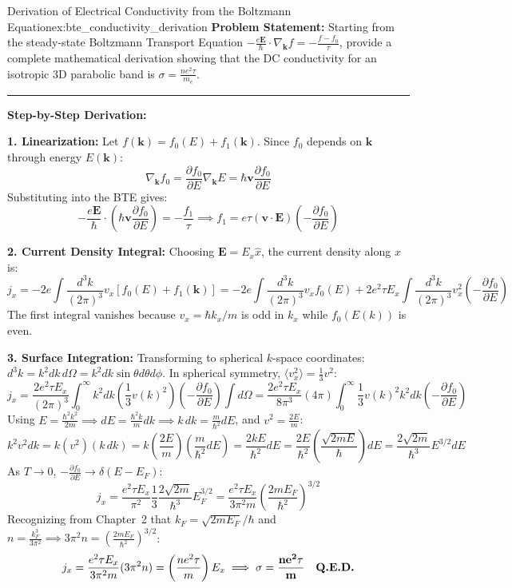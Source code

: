 \documentclass[11pt,a4paper]{article}
\newcommand{\vb}[1]{\mathbf{#1}}
\begin{document}
\begin{examplebox}{Derivation of Electrical Conductivity from the Boltzmann Equation}{ex:bte_conductivity_derivation}
\textbf{Problem Statement:}
Starting from the steady-state Boltzmann Transport Equation $-\frac{e\vb{E}}{\hbar}\cdot\nabla_{\vb{k}}f = -\frac{f - f_0}{\tau}$, provide a complete mathematical derivation showing that the DC conductivity for an isotropic 3D parabolic band is $\sigma = \frac{n e^2 \tau}{m_e}$.

\vspace{0.2cm}\hrule\vspace{0.2cm}
\textbf{Step-by-Step Derivation:}

\textbf{1. Linearization:}
Let $f(\vb{k}) = f_0(E) + f_1(\vb{k})$. Since $f_0$ depends on $\vb{k}$ through energy $E(\vb{k})$:
\[
\nabla_{\vb{k}}f_0 = \frac{\partial f_0}{\partial E}\nabla_{\vb{k}}E = \hbar\vb{v}\frac{\partial f_0}{\partial E}
\]
Substituting into the BTE gives:
\[
-\frac{e\vb{E}}{\hbar}\cdot\left(\hbar\vb{v}\frac{\partial f_0}{\partial E}\right) = -\frac{f_1}{\tau} \implies f_1 = e\tau(\vb{v}\cdot\vb{E})\left(-\frac{\partial f_0}{\partial E}\right)
\]

\textbf{2. Current Density Integral:}
Choosing $\vb{E} = E_x\hat{x}$, the current density along $x$ is:
\[
j_x = -2e\int \frac{d^3k}{(2\pi)^3} v_x [f_0(E) + f_1(\vb{k})] = -2e\int \frac{d^3k}{(2\pi)^3} v_x f_0(E) + 2e^2\tau E_x \int \frac{d^3k}{(2\pi)^3} v_x^2 \left(-\frac{\partial f_0}{\partial E}\right)
\]
The first integral vanishes because $v_x = \hbar k_x/m$ is odd in $k_x$ while $f_0(E(k))$ is even.

\textbf{3. Surface Integration:}
Transforming to spherical $k$-space coordinates: $d^3k = k^2 dk\, d\Omega = k^2 dk \sin\theta d\theta d\phi$. In spherical symmetry, $\langle v_x^2 \rangle = \frac{1}{3}v^2$:
\[
j_x = \frac{2e^2\tau E_x}{(2\pi)^3} \int_0^\infty k^2 dk \left( \frac{1}{3}v(k)^2 \right)\left(-\frac{\partial f_0}{\partial E}\right) \int d\Omega = \frac{2e^2\tau E_x}{8\pi^3}(4\pi) \int_0^\infty \frac{1}{3} v(k)^2 k^2 dk \left(-\frac{\partial f_0}{\partial E}\right)
\]
Using $E = \frac{\hbar^2 k^2}{2m} \implies dE = \frac{\hbar^2 k}{m}dk \implies k\,dk = \frac{m}{\hbar^2}dE$, and $v^2 = \frac{2E}{m}$:
\[
k^2 v^2 dk = k(v^2)(k\,dk) = k \left(\frac{2E}{m}\right)\left(\frac{m}{\hbar^2}dE\right) = \frac{2kE}{\hbar^2}dE = \frac{2E}{\hbar^2}\left(\frac{\sqrt{2mE}}{\hbar}\right)dE = \frac{2\sqrt{2m}}{\hbar^3}E^{3/2}dE
\]
As $T \to 0$, $-\frac{\partial f_0}{\partial E} \to \delta(E - E_F)$:
\[
j_x = \frac{e^2\tau E_x}{\pi^2} \frac{1}{3} \frac{2\sqrt{2m}}{\hbar^3} E_F^{3/2} = \frac{e^2\tau E_x}{3\pi^2 m}\left(\frac{2mE_F}{\hbar^2}\right)^{3/2}
\]
Recognizing from Chapter~2 that $k_F = \sqrt{2mE_F}/\hbar$ and $n = \frac{k_F^3}{3\pi^2} \implies 3\pi^2 n = \left(\frac{2mE_F}{\hbar^2}\right)^{3/2}$:
\[
j_x = \frac{e^2\tau E_x}{3\pi^2 m}(3\pi^2 n) = \left(\frac{n e^2 \tau}{m}\right)E_x \implies \mathbf{\sigma = \frac{n e^2 \tau}{m}} \quad \text{\textbf{Q.E.D.}}
\]
\end{examplebox}
\end{document}
